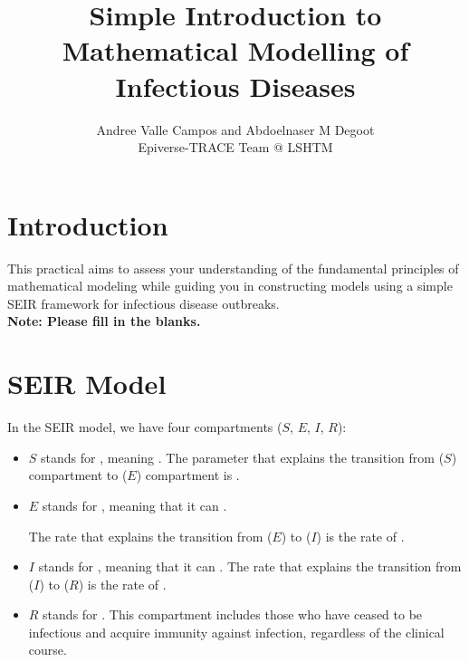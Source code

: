 \documentclass{article}
\author{Andree Valle Campos and Abdoelnaser M Degoot \\ Epiverse-TRACE Team @ LSHTM }
\title{Simple Introduction to Mathematical Modelling of Infectious Diseases}
\begin{document}
\maketitle

\section{Introduction}
This practical aims to assess your understanding of the fundamental
principles of mathematical modeling while guiding you in constructing models using
a simple SEIR framework for infectious disease outbreaks.\\

 \textbf{Note: Please fill in the blanks.}

\section{SEIR Model}

 In the  SEIR model, we have four compartments (\( S \), \( E \), \( I \), \( R \)):

\begin{itemize}
    \item \( S \) stands for \underline{\hspace{2cm}}, meaning \underline{\hspace{6cm}}.
The parameter that explains the transition from  (\( S \)) compartment
to  (\( E \)) compartment is \underline{\hspace{6cm}}.
\item \(E\) stands for \underline{\hspace{2cm}}, meaning that it can
    \underline{\hspace{4cm}}.

    The rate that explains the transition from  (\( E \)) to  (\( I \)) is the rate of \underline{\hspace{1cm}}.

    \item \( I \) stands for \underline{\hspace{2cm}}, meaning that it can
    \underline{\hspace{4cm}}.
    The rate that explains the transition from  (\( I \)) to  (\( R \)) is the rate of \underline{\hspace{1cm}}.

    \item \( R \) stands for \underline{\hspace{3cm}}. This compartment includes those who have ceased to be infectious and acquire immunity against infection, regardless of the clinical course.
\end{itemize}
\end{document}
